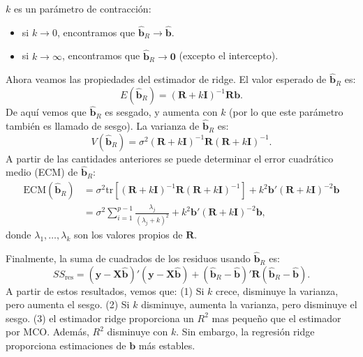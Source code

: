 \documentclass[
]{article}
\providecommand{\tightlist}{%
  \setlength{\itemsep}{0pt}\setlength{\parskip}{0pt}}
\begin{document}
\(k\) es un parámetro de contracción:

\begin{itemize}
\tightlist
\item
  si \(k \rightarrow 0\), encontramos que \(\widehat{\boldsymbol b}_{R} \rightarrow \widehat{\boldsymbol b}\).
\item
  si \(k \rightarrow \infty\), encontramos que \(\widehat{\boldsymbol b}_{R} \rightarrow \boldsymbol 0\) (excepto el intercepto).
\end{itemize}

Ahora veamos las propiedades del estimador de ridge. El valor esperado de \(\widehat{\boldsymbol b}_{R}\) es:
\[
E(\widehat{\boldsymbol b}_{R}) = (\boldsymbol R+ k \boldsymbol I)^{-1}\boldsymbol R\boldsymbol b.
\]
De aquí vemos que \(\widehat{\boldsymbol b}_{R}\) es sesgado, y aumenta con \(k\) (por lo que este parámetro también es llamado de sesgo). La varianza de \(\widehat{\boldsymbol b}_{R}\) es:
\[
V(\widehat{\boldsymbol b}_{R}) = \sigma^{2}(\boldsymbol R+ k \boldsymbol I)^{-1}\boldsymbol R(\boldsymbol R+ k \boldsymbol I)^{-1}.
\]
A partir de las cantidades anteriores se puede determinar el error cuadrático medio (ECM) de \(\widehat{\boldsymbol b}_{R}\):
\begin{equation}
\begin{split}
\mbox{ECM}(\widehat{\boldsymbol b}_{R}) &= \sigma^{2}\mbox{tr}[(\boldsymbol R+ k\boldsymbol I)^{-1}\boldsymbol R(\boldsymbol R+ k\boldsymbol I)^{-1}] + k^{2}\boldsymbol b'(\boldsymbol R+ k\boldsymbol I)^{-2}\boldsymbol b\\
&=\sigma^{2}\sum_{i=1}^{p-1}\frac{\lambda_{j}}{(\lambda_{j}+ k)^2} + k^{2} \boldsymbol b'(\boldsymbol R+ k\boldsymbol I)^{-2}\boldsymbol b,
\end{split}
\nonumber
\end{equation}
donde \(\lambda_{1},\ldots,\lambda_{k}\) son los valores propios de \(\boldsymbol R\).

Finalmente, la suma de cuadrados de los residuos usando \(\widehat{\boldsymbol b}_{R}\) es:
\[
SS_{\mbox{res}}= (\boldsymbol y- \boldsymbol X\widehat{\boldsymbol b})'(\boldsymbol y- \boldsymbol X\widehat{\boldsymbol b}) + (\widehat{\boldsymbol b}_{R}-\widehat{\boldsymbol b})'\boldsymbol R(\widehat{\boldsymbol b}_{R}-\widehat{\boldsymbol b}).
\]
A partir de estos resultados, vemos que: (1) Si \(k\) crece, disminuye la varianza, pero aumenta el sesgo. (2) Si \(k\) disminuye, aumenta la varianza, pero disminuye el sesgo. (3) el estimador ridge proporciona un \(R^{2}\) mas pequeño que el estimador por MCO. Además, \(R^2\) disminuye con \(k\). Sin embargo, la regresión ridge proporciona estimaciones de \(\boldsymbol b\) más estables.
\end{document}
